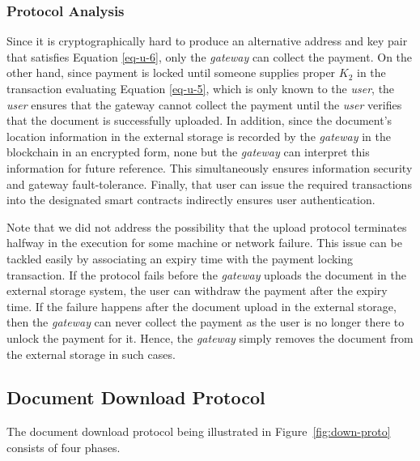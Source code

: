 \subsubsection*{Protocol Analysis}
Since it is cryptographically hard to produce an alternative address and key pair that satisfies Equation \ref{eq-u-6}, only the {\it gateway} can collect the payment. On the other hand, since payment is locked until someone supplies proper $K_2$ in the transaction evaluating Equation \ref{eq-u-5}, which is only known to the {\it user}, the {\it user} ensures that the gateway cannot collect the payment until the {\it user} verifies that the document is successfully uploaded. In addition, since the document's location information in the external storage is recorded by the {\it gateway} in the blockchain in an encrypted form, none but the {\it gateway} can interpret this information for future reference. This simultaneously ensures information security and gateway fault-tolerance. Finally, that user can issue the required transactions into the designated smart contracts indirectly ensures user authentication. 

Note that we did not address the possibility that the upload protocol terminates halfway in the execution for some machine or network failure. This issue can be tackled easily by associating an expiry time with the payment locking transaction. If the protocol fails before the {\it gateway} uploads the document in the external storage system, the user can withdraw the payment after the expiry time. If the failure happens after the document upload in the external storage, then the {\it gateway} can never collect the payment as the user is no longer there to unlock the payment for it. Hence, the {\it gateway} simply removes the document from the external storage in such cases.      

\subsection{Document Download Protocol}
The document download protocol being illustrated in Figure~\ref{fig:down-proto} consists of four phases.

